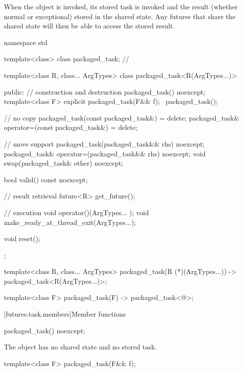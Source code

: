 \pnum
When the  object is invoked, its stored task is invoked and the
result (whether normal or exceptional) stored in the shared state. Any futures that
share the shared state will then be able to access the stored result.

%
\begin{codeblock}
namespace std {
  template<class> class packaged_task;  // \notdef

  template<class R, class... ArgTypes>
  class packaged_task<R(ArgTypes...)> {
  public:
    // construction and destruction
    packaged_task() noexcept;
    template<class F>
      explicit packaged_task(F&& f);
    ~packaged_task();

    // no copy
    packaged_task(const packaged_task&) = delete;
    packaged_task& operator=(const packaged_task&) = delete;

    // move support
    packaged_task(packaged_task&& rhs) noexcept;
    packaged_task& operator=(packaged_task&& rhs) noexcept;
    void swap(packaged_task& other) noexcept;

    bool valid() const noexcept;

    // result retrieval
    future<R> get_future();

    // execution
    void operator()(ArgTypes... );
    void make_ready_at_thread_exit(ArgTypes...);

    void reset();
  };

  template<class R, class... ArgTypes>
    packaged_task(R (*)(ArgTypes...)) -> packaged_task<R(ArgTypes...)>;

  template<class F> packaged_task(F) -> packaged_task<@\seebelow@>;
}
\end{codeblock}

[futures.task.members]{Member functions}

%
\begin{itemdecl}
packaged_task() noexcept;
\end{itemdecl}

\begin{itemdescr}
\pnum
\effects
The object has no shared state and no stored task.
\end{itemdescr}

%
\begin{itemdecl}
template<class F>
  packaged_task(F&& f);
\end{itemdecl}


